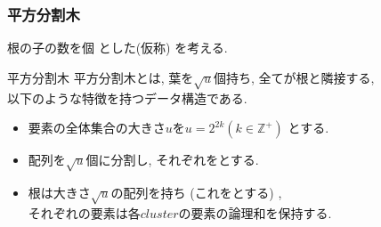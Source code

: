 \documentclass[main]{subfiles}
\begin{document}
\begin{frame}\frametitle{平方分割木}
根の子の数を個 とした(仮称) を考える.
\begin{block}{平方分割木}
	平方分割木とは, 葉を$\sqrt{u}$個持ち, 全てが根と隣接する, \\以下のような特徴を持つデータ構造である.\\
	\begin{itemize}
	\item 要素の全体集合の大きさ$u$を$u = 2^{2k} (k \in \mathbb{Z}^{+})$ とする.\\
	\item 配列を$\sqrt{u}$個に分割し, それぞれをとする.\\
	\item 根は大きさ$\sqrt{u}$の配列を持ち (これをとする) ,\\ それぞれの要素は各$cluster$の要素の論理和を保持する.
	\end{itemize}
\end{block}


\end{frame}
\end{document}
